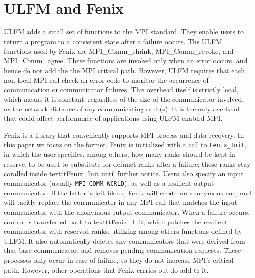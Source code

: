 \section{ULFM and Fenix}\label{sec:implem}
ULFM adds a small set of functions to the MPI standard.
They enable users to return a program to a consistent state after a failure occurs.
The ULFM functions used by Fenix are MPI\_Comm\_shrink, MPI\_Comm\_revoke, and MPI\_Comm\_agree.
These functions are invoked only when an error occurs, and hence do
not add the the MPI critical path.
However, ULFM requires that each non-local MPI call check an error code to
monitor the occurrence of communication or communicator failures.
This overhead itself is strictly local, which means it is constant, regardless of the
size of the communicator involved, or the network distance of any communicating rank(s).
It is the only overhead that could affect performance of applications using
ULFM-enabled MPI.

Fenix is a library \cite{fenixspec} that conveniently supports MPI process and data
recovery. In this paper we focus on the former.
Fenix is initialized with a call to \texttt{Fenix\_Init}, in which the user specifies,
among others, how many ranks should be kept in reserve, to be used to substitute for
defunct ranks after a failure; these ranks stay coralled inside texttt{Fenix\_Init}
until further notice.
Users also specify an input communicator (usually \texttt{MPI\_COMM\_WORLD}), as well
as a resilient output communicator.
If the latter is left blank, Fenix will create an anonymous one, and will tacitly
replace the communicator in any MPI call that matches the input communicator with
the anonymous output communicator.
When a failure occurs, control is transferred back to texttt{Fenix\_Init}, which patches
the resilient communicator with reserved ranks, utilizing among others functions
defined by ULFM.
It also automatically deletes any communicators that were derived from that base
communicator, and removes pending communication requests.
These processes only occur in case of failure, so they do not increase MPI's critical
path. However, other operations that Fenix carries out do add to it.

